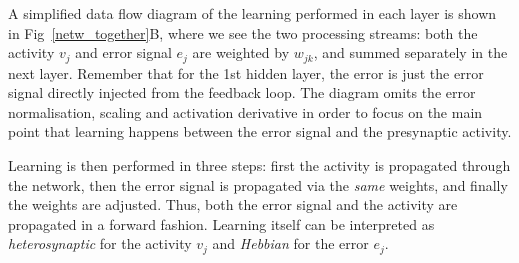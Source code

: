 \documentclass{article}
\begin{document}
A simplified data flow diagram of the learning performed in each layer
is shown in Fig~\ref{netw_together}B, where we see the two processing
streams: both the activity $v_j$ and error signal $e_j$ are weighted
by $w_{jk}$, and summed separately in the next layer. Remember that
for the 1st hidden layer, the error is just the error signal
directly injected from the feedback loop. The diagram omits the error
normalisation, scaling and activation derivative in order to focus on
the main point that learning happens between the error signal and the
presynaptic activity.

Learning is then performed in three steps: first the activity is
propagated through the network, then the error signal is propagated
via the \textsl{same} weights, and finally the weights are adjusted. Thus,
both the error signal and the activity are propagated in a forward
fashion. Learning itself can be interpreted as \textsl{heterosynaptic} for the
activity $v_j$ and \textsl{Hebbian} for the error $e_j$.
\end{document}

